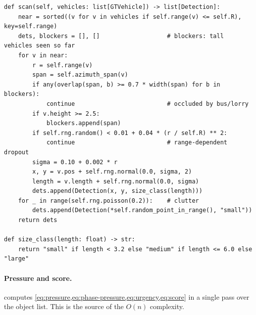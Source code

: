 \begin{lstlisting}[style=py,caption={Noisy, occluded LiDAR scan (\texttt{sensing/virtual\_lidar.py})},label={lst:impl-vls}]
def scan(self, vehicles: list[GTVehicle]) -> list[Detection]:
    near = sorted((v for v in vehicles if self.range(v) <= self.R), key=self.range)
    dets, blockers = [], []                   # blockers: tall vehicles seen so far
    for v in near:
        r = self.range(v)
        span = self.azimuth_span(v)
        if any(overlap(span, b) >= 0.7 * width(span) for b in blockers):
            continue                          # occluded by bus/lorry
        if v.height >= 2.5:
            blockers.append(span)
        if self.rng.random() < 0.01 + 0.04 * (r / self.R) ** 2:
            continue                          # range-dependent dropout
        sigma = 0.10 + 0.002 * r
        x, y = v.pos + self.rng.normal(0.0, sigma, 2)
        length = v.length + self.rng.normal(0.0, sigma)
        dets.append(Detection(x, y, size_class(length)))
    for _ in range(self.rng.poisson(0.2)):    # clutter
        dets.append(Detection(*self.random_point_in_range(), "small"))
    return dets

def size_class(length: float) -> str:
    return "small" if length < 3.2 else "medium" if length <= 6.0 else "large"
\end{lstlisting}

\paragraph{Pressure and score.}  computes \cref{eq:pressure,eq:phase-pressure,eq:urgency,eq:score}
in a single pass over the object list. This is the source of the $O(n)$ complexity.


